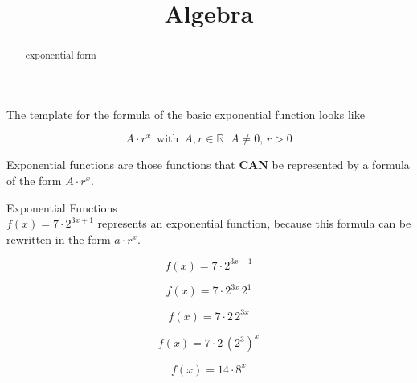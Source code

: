 \documentclass{ximera}
\title{Algebra}
\begin{document}
\begin{abstract}
exponential form
\end{abstract}
\maketitle










The template for the formula of the basic exponential function looks like



\[  A \cdot r^x   \, \text{ with } \,  A, r \in \mathbb{R} \, | \,  A \ne 0, \, r > 0   \]




Exponential functions are those functions that \textbf{\textcolor{red!80!black}{CAN}} be represented by a formula of the form $A \cdot r^x$.
















\begin{example}  Exponential Functions \\



$f(x) = 7 \cdot 2^{3x+1} $ represents an exponential function, because this formula can be rewritten in the form $a \cdot r^x$.   \\


\begin{explanation}


\[
f(x) = 7 \cdot 2^{3x+1}
\]


\[
f(x) = 7 \cdot 2^{3x}  \, 2^1
\]

\[
f(x) = 7 \cdot 2 \, 2^{3x} 
\]

\[
f(x) = 7 \cdot 2 \, (2^3)^x 
\]

\[
f(x) = 14 \cdot 8^x 
\]


\end{explanation}

\end{example}
\end{document}
